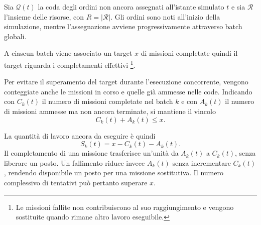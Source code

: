 Sia $\mathcal{Q}(t)$ la coda degli ordini non ancora assegnati
all'istante simulato $t$ e sia $\mathcal{R}$ l'insieme delle
risorse, con $R=|\mathcal{R}|$. Gli ordini sono noti
all'inizio della simulazione, mentre l'assegnazione avviene
progressivamente attraverso batch globali.

A ciascun batch viene associato un target $x$ di missioni
completate quindi il target riguarda i completamenti effettivi \footnote{
	Le missioni fallite non contribuiscono al suo raggiungimento
	e vengono sostituite quando rimane altro lavoro eseguibile.}.

Per evitare il superamento del target durante l'esecuzione
concorrente, vengono conteggiate anche le missioni in corso
e quelle già ammesse nelle code. Indicando con $C_k(t)$
il numero di missioni completate nel batch $k$ e con
$A_k(t)$ il numero di missioni ammesse ma non ancora
terminate, si mantiene il vincolo
\begin{equation}
	C_k(t)+A_k(t)\leq x.
	\label{eq:prenotazione_target_batch}
\end{equation}

\noindent La quantità di lavoro ancora da eseguire è quindi
\begin{equation}
	S_k(t)=x-C_k(t)-A_k(t).
\end{equation}
Il completamento di una missione trasferisce un'unità
da $A_k(t)$ a $C_k(t)$, senza liberare un posto.
Un fallimento riduce invece $A_k(t)$ senza incrementare
$C_k(t)$, rendendo disponibile un posto per una missione
sostitutiva. Il numero complessivo di tentativi può
pertanto superare $x$.

